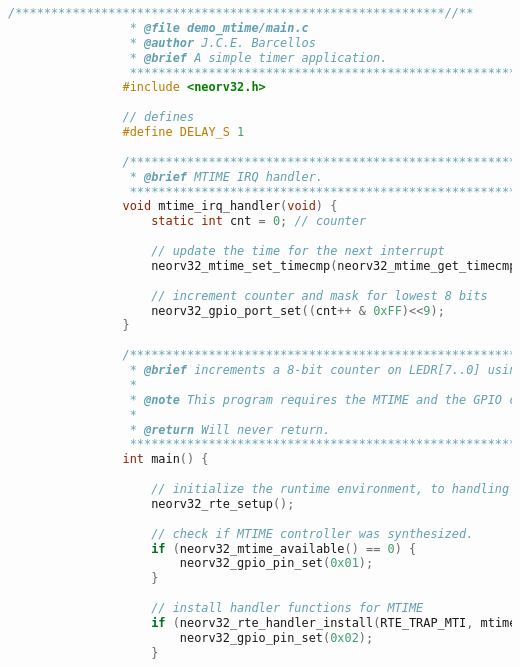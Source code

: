             \begin{lstlisting}[style=mystyle_c, language=c, breaklines]
                /************************************************************//**
                 * @file demo_mtime/main.c
                 * @author J.C.E. Barcellos
                 * @brief A simple timer application.
                 ***************************************************************/
                #include <neorv32.h>
                
                // defines
                #define DELAY_S 1
                
                /************************************************************//**
                 * @brief MTIME IRQ handler.
                 ***************************************************************/
                void mtime_irq_handler(void) {
                    static int cnt = 0; // counter
                
                    // update the time for the next interrupt
                    neorv32_mtime_set_timecmp(neorv32_mtime_get_timecmp() + DELAY_S*(NEORV32_SYSINFO->CLK / 2));
                
                    // increment counter and mask for lowest 8 bits
                	neorv32_gpio_port_set((cnt++ & 0xFF)<<9); 
                }
                
                /************************************************************//**
                 * @brief increments a 8-bit counter on LEDR[7..0] using the machine timer interrupt.
                 *
                 * @note This program requires the MTIME and the GPIO controller to be synthesized.
                 *
                 * @return Will never return.
                 ***************************************************************/
                int main() {
                
                    // initialize the runtime environment, to handling all CPU's traps
                    neorv32_rte_setup();
                
                    // check if MTIME controller was synthesized.
                    if (neorv32_mtime_available() == 0) {
                        neorv32_gpio_pin_set(0x01);
                    }
                
                    // install handler functions for MTIME 
                    if (neorv32_rte_handler_install(RTE_TRAP_MTI, mtime_irq_handler) != 0) {
                        neorv32_gpio_pin_set(0x02);
                    }
                

\end{lstlisting}
